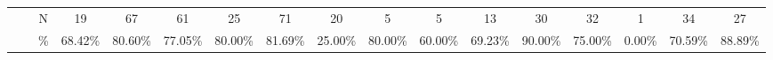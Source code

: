 \documentclass{sigchi}
\begin{document}
\begin{table}[t]
\begin{adjustbox}{width=1\textwidth}
\begin{tabular}{ccccccccccccccccc}
			\multicolumn{1}{|l|}{}                               & \multicolumn{1}{c|}{}                        & \multicolumn{1}{c|}{N}     & \multicolumn{1}{c|}{19}                                   & \multicolumn{1}{c|}{67}                                  & \multicolumn{1}{c|}{61}                                   & \multicolumn{1}{c|}{25}                                  & \multicolumn{1}{c|}{\cellcolor[HTML]{ACDDAA}71}                & \multicolumn{1}{c|}{\cellcolor[HTML]{ACDDAA}20}             & \multicolumn{1}{c|}{5}                                & \multicolumn{1}{c|}{5}                               & \multicolumn{1}{c|}{13}                              & \multicolumn{1}{c|}{30}                              & \multicolumn{1}{c|}{32}                              & \multicolumn{1}{c|}{1}                               & \multicolumn{1}{c|}{\cellcolor[HTML]{FFFFC7}34}           & \multicolumn{1}{c|}{\cellcolor[HTML]{FFFFC7}27}          \\ \cline{3-17} 
			\multicolumn{1}{|l|}{}                               & \multicolumn{1}{c|}{}                        & \multicolumn{1}{c|}{\%}  & \multicolumn{1}{c|}{68.42\%}                              & \multicolumn{1}{c|}{80.60\%}                             & \multicolumn{1}{c|}{77.05\%}                              & \multicolumn{1}{c|}{80.00\%}                             & \multicolumn{1}{c|}{\cellcolor[HTML]{ACDDAA}81.69\%}           & \multicolumn{1}{c|}{\cellcolor[HTML]{ACDDAA}25.00\%}        & \multicolumn{1}{c|}{80.00\%}                          & \multicolumn{1}{c|}{60.00\%}                         & \multicolumn{1}{c|}{69.23\%}                         & \multicolumn{1}{c|}{90.00\%}                         & \multicolumn{1}{c|}{75.00\%}                         & \multicolumn{1}{c|}{0.00\%}                          & \multicolumn{1}{c|}{\cellcolor[HTML]{FFFFC7}70.59\%}      & \multicolumn{1}{c|}{\cellcolor[HTML]{FFFFC7}88.89\%}     \\ \cline{3-17} 

\end{tabular}
\end{adjustbox}
\end{table}
\end{document}
